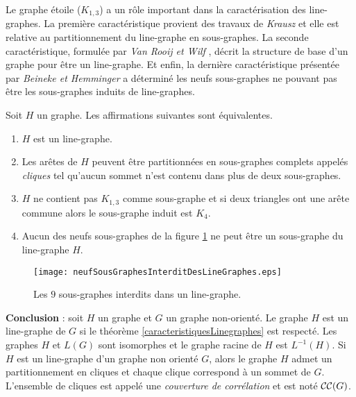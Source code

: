 Le graphe \'etoile ($K_{1,3}$) a un r\^ole important dans la caract\'erisation des line-graphes.
La premi\`ere caract\'eristique provient des travaux de {\em Krausz} \cite{krausz1943demonstration} et elle est relative au partitionnement du line-graphe en sous-graphes. 
La seconde caract\'eristique, formul\'ee par {\em Van Rooij et Wilf} \cite{ROOIJetWILF1965interchange}, d\'ecrit la structure de base d'un graphe pour \^etre un line-graphe. 
Et enfin, la derni\`ere caract\'eristique pr\'esent\'ee par {\em Beineke\cite{beineke1968derived} et Hemminger} a d\'etermin\'e les neufs sous-graphes ne pouvant pas \^etre les sous-graphes induits  de line-graphes. 
\begin{theorem}\cite{lineGraphe}
\label{caracteristiquesLinegraphes}
Soit $H$ un graphe. Les affirmations suivantes sont \'equivalentes.
\begin{enumerate}[label = (\alph*)]
	\item $H$ est un line-graphe.
	\item Les ar\^etes de $H$ peuvent \^etre partitionn\'ees en sous-graphes complets appel\'es {\em cliques} tel qu'aucun sommet n'est contenu dans plus de deux sous-graphes. 
	\item $H$ ne contient pas $K_{1,3}$ comme sous-graphe et si deux triangles ont une ar\^ete commune alors le sous-graphe induit est $K_4$.
	\item Aucun des neufs sous-graphes de la figure \ref{neufSousGraphesInterditDesLineGraphes} ne peut \^etre un sous-graphe du line-graphe $H$.
\end{enumerate}
\end{theorem}

\begin{figure}[htb!]\vspace{-0.5em}
	\centering
	\texttt{[image: neufSousGraphesInterditDesLineGraphes.eps]}\vspace{-0.5em}
	\caption{ Les $9$ sous-graphes interdits dans un line-graphe. }\vspace{-0.5em}
	\label{neufSousGraphesInterditDesLineGraphes}
\end{figure}
\FloatBarrier

{\bf Conclusion} :
soit $H$ un graphe et $G$ un graphe non-orient\'e.
Le graphe $H$ est un line-graphe de $G$ si le th\'eor\`eme \ref{caracteristiquesLinegraphes} est respect\'e.
Les graphes $H$ et $L(G)$ sont isomorphes et le graphe racine de $H$ est $L^{-1}(H)$.
Si $H$ est un line-graphe d'un graphe non orient\'e $G$,
alors le graphe $H$ admet un partitionnement en cliques et chaque clique correspond \`a un sommet de $G$. L'ensemble de cliques est appel\'e une {\em couverture de corr\'elation} et est not\'e ${\cal CC}(G)$.